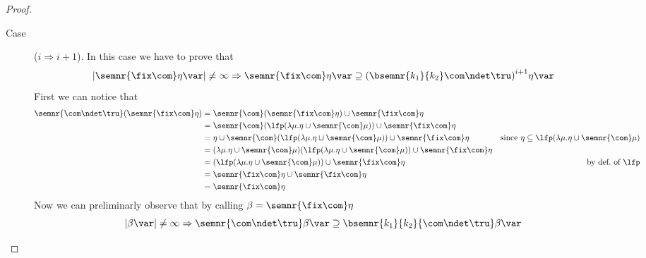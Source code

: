 \begin{proof}
\begin{inductive}
\begin{description}
    \item[Case] (\(i \Rightarrow i+1\)). In this case we have to prove
      that
      \begin{equation*}
        |\semnr{\fix\com}\eta\var| \neq \infty \Rightarrow \semnr{\fix\com}\eta\var \supseteq {\left(\bsemnr{k_1}{k_2}\com\ndet\tru\right)}^{i+1}\eta\var
      \end{equation*}
      First we can notice that
      \begin{align*}
        \semnr{\com\ndet\tru}(\semnr{\fix\com}\eta) & = \semnr{\com}(\semnr{\fix\com}\eta) \cup \semnr{\fix\com}\eta \\
                                                    & = \semnr{\com}(\lfp(\lambda \mu . \eta \cup \semnr{\com}\mu)) \cup \semnr{\fix\com}\eta \\
                                                    & = \eta \cup \semnr{\com}(\lfp(\lambda \mu . \eta \cup \semnr{\com}\mu)) \cup \semnr{\fix\com}\eta & \text{since } \eta \subseteq \lfp(\lambda \mu . \eta \cup \semnr{\com}\mu)\\
                                                    & = (\lambda \mu . \eta \cup \semnr{\com}\mu)(\lfp(\lambda \mu . \eta \cup \semnr{\com}\mu)) \cup \semnr{\fix\com}\eta \\
                                                    & = (\lfp(\lambda \mu . \eta \cup \semnr{\com}\mu)) \cup \semnr{\fix\com}\eta & \text{by def.\ of } \lfp\\
                                                    & = \semnr{\fix\com}\eta \cup \semnr{\fix\com}\eta \\
                                                    & = \semnr{\fix\com}\eta
      \end{align*}
      Now we can preliminarly observe that by calling
      \(\beta = \semnr{\fix\com}\eta\)
      \begin{equation*}
        |\beta\var| \neq\infty \Rightarrow \semnr{\com\ndet\tru}\beta\var \supseteq \bsemnr{k_1}{k_2}{\com\ndet\tru}\beta\var

\end{equation*}
\end{description}
\end{inductive}
\end{proof}
